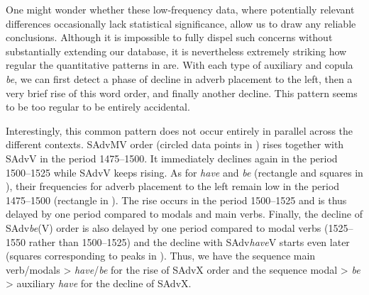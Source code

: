 \documentclass[output=paper]{langsci/langscibook}
\begin{document}
One might wonder whether these low-frequency data, where potentially relevant
differences occasionally lack statistical significance, allow us to draw any
reliable conclusions. Although it is impossible to fully dispel such concerns
without substantially extending our database, it is nevertheless extremely
striking how regular the quantitative patterns in  are. With
each type of auxiliary and copula \emph{be}, we can first detect a phase of
decline in adverb placement to the left, then a very brief rise of this word
order, and finally another decline. This pattern seems to be too regular to be
entirely accidental.

Interestingly, this common pattern does not occur entirely in parallel across
the different contexts. SAdvMV order (circled data points in
) rises together with SAdvV in the period 1475--1500. It
immediately declines again in the period 1500--1525 while SAdvV keeps rising. As
for \emph{have} and \emph{be} (rectangle and squares in
), their frequencies for adverb placement to the left remain
low in the period 1475--1500 (rectangle in ). The rise occurs
in the period 1500--1525 and is thus delayed by one period compared to modals
and main verbs. Finally, the decline of SAdv\emph{be}(V) order is also
delayed by one period compared to modal verbs (1525--1550 rather than 1500--1525)
and the decline with SAdv\emph{have}V starts even later (squares
corresponding to peaks in ). Thus, we have the sequence main
verb/modals > \emph{have}/\emph{be} for the rise of SAdvX order and the
sequence modal > \emph{be} > auxiliary \emph{have} for the decline of
SAdvX.
\end{document}
